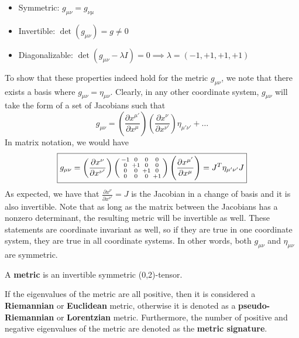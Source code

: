 \documentclass{article}
\begin{document}
 			\begin{itemize}
 				\item Symmetric: $g_{\mu\nu} = g_{\nu\mu}$ 
 				\item Invertible: $\det(g_{\mu\nu}) = g \neq 0$
 				\item Diagonalizable: $\det(g_{\mu\nu}-\lambda I) =0\implies\lambda =(-1,+1,+1,+1)$
 			\end{itemize}
 			To show that these properties indeed hold for the metric $g_{\mu\nu}$, we note that there exists a basis where $g_{\mu\nu} = \eta_{\mu\nu}$. Clearly, in any other coordinate system, $g_{\mu\nu}$ will take the form of a set of Jacobians such that
 			$$ g_{\mu\nu} = \left( \frac{\partial x^{\mu'}}{\partial x^\mu} \right)\left( \frac{\partial x^{\nu}}{\partial x^{\nu'}} \right)\eta_{\mu' \nu'} + \dots$$
 			In matrix notation, we would have
 			\begin{equation}
 				\label{eq:MetricMatrix}
 				\boxed{g_{\mu\nu} = \left( \frac{\partial x^{\nu}}{\partial x^{\nu'}} \right)\begin{psmallmatrix}
 						-1 & 0 & 0 & 0 \\
 						0 & +1& 0 & 0 \\
 						0 & 0 & +1 & 0 \\
 						0 & 0 & 0 & +1
 					\end{psmallmatrix}\left( \frac{\partial x^{\mu'}}{\partial x^\mu} \right) = J^T \eta_{\mu'\nu'} J}
 			\end{equation}
 			As expected, we have that $ \frac{\partial x^{\nu}}{\partial x^{\nu'}}  = J$ is the Jacobian in a change of basis and it is also invertible. Note that as long as the matrix between the Jacobians has a nonzero determinant, the resulting metric will be invertible as well. These statements are coordinate invariant as well, so if they are true in one coordinate system, they are true in all coordinate systems. In other words, both $g_{\mu\nu}$ and $\eta_{\mu\nu}$ are symmetric.
 			
 			\begin{defn}
 				A \textbf{metric} is an invertible symmetric (0,2)-tensor.
 			\end{defn}
 			If the eigenvalues of the metric are all positive, then it is considered a \textbf{Riemannian} or \textbf{Euclidean} metric, otherwise it is denoted as a \textbf{pseudo-Riemannian} or \textbf{Lorentzian} metric. Furthermore, the number of positive and negative eigenvalues of the metric are denoted as the \textbf{metric signature}.
 			
\end{document}
